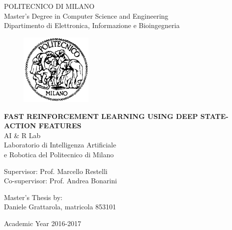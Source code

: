 \thispagestyle{empty}
\vspace*{-1.5cm} \bfseries{
\begin{center}
  \large
  POLITECNICO DI MILANO\\
  \normalsize
  Master's Degree in Computer Science and Engineering\\
  Dipartimento di Elettronica, Informazione e Bioingegneria\\
  \begin{figure}[htbp]
    \begin{center}
      \includegraphics[width=3.5cm]{./pictures/logopm.eps}
    \end{center}
  \end{figure}
  \vspace*{0.3cm} \LARGE



  \textbf{FAST REINFORCEMENT LEARNING USING DEEP STATE-ACTION FEATURES}\\



  \vspace*{.75truecm} \large
  AI \& R Lab \\
  Laboratorio di Intelligenza Artificiale \\
  e Robotica del Politecnico di Milano
\end{center}
\vspace*{3.0cm} \large
\begin{flushleft}


  Supervisor: Prof. Marcello Restelli \\
  Co-supervisor: Prof. Andrea Bonarini 

\end{flushleft}
\vspace*{1.0cm}
\begin{flushright}


  Master's Thesis by:\\ Daniele Grattarola, matricola 853101


\end{flushright}
\vspace*{0.5cm}
\begin{center}



  Academic Year 2016-2017
\end{center} \clearpage
}
